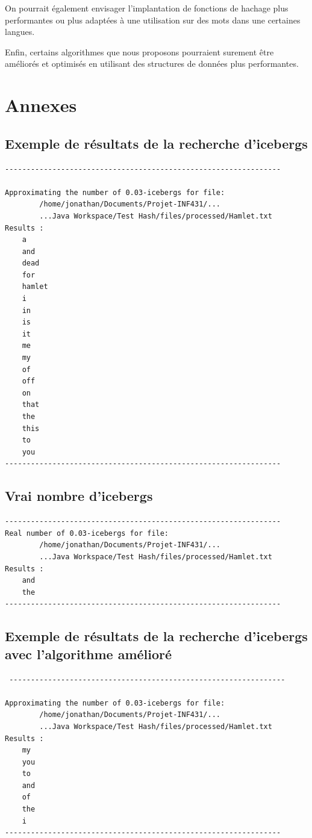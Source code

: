 \documentclass[12pt,a4paper,titlepage]{article}
\begin{document}
On pourrait également envisager l'implantation de fonctions de hachage plus performantes ou plus adaptées à une utilisation sur des mots dans une certaines langues.

Enfin, certains algorithmes que nous proposons pourraient surement être améliorés et optimisés en utilisant des structures de données plus performantes.



\newpage
\section*{Annexes}
 
\subsection*{Exemple de résultats de la recherche d'icebergs}
\label{exemple:icebergs}

\begin{verbatim}
----------------------------------------------------------------

Approximating the number of 0.03-icebergs for file:
        /home/jonathan/Documents/Projet-INF431/...
        ...Java Workspace/Test Hash/files/processed/Hamlet.txt
Results :
    a
    and
    dead
    for
    hamlet
    i
    in
    is
    it
    me
    my
    of
    off
    on
    that
    the
    this
    to
    you
----------------------------------------------------------------
\end{verbatim}

\subsection*{Vrai nombre d'icebergs}
\label{exemple:icebergsBenchmark}

\begin{verbatim}
----------------------------------------------------------------
Real number of 0.03-icebergs for file:
        /home/jonathan/Documents/Projet-INF431/...
        ...Java Workspace/Test Hash/files/processed/Hamlet.txt	
Results :
    and
    the
----------------------------------------------------------------
\end{verbatim}

\newpage
\subsection*{Exemple de résultats de la recherche d'icebergs avec l'algorithme amélioré}
\label{exemple:icebergsImproved}
 
 \begin{verbatim}
 ----------------------------------------------------------------

Approximating the number of 0.03-icebergs for file:
        /home/jonathan/Documents/Projet-INF431/...
        ...Java Workspace/Test Hash/files/processed/Hamlet.txt
Results :
    my
    you
    to
    and
    of
    the
    i
----------------------------------------------------------------
 \end{verbatim}
 
 
\end{document}
